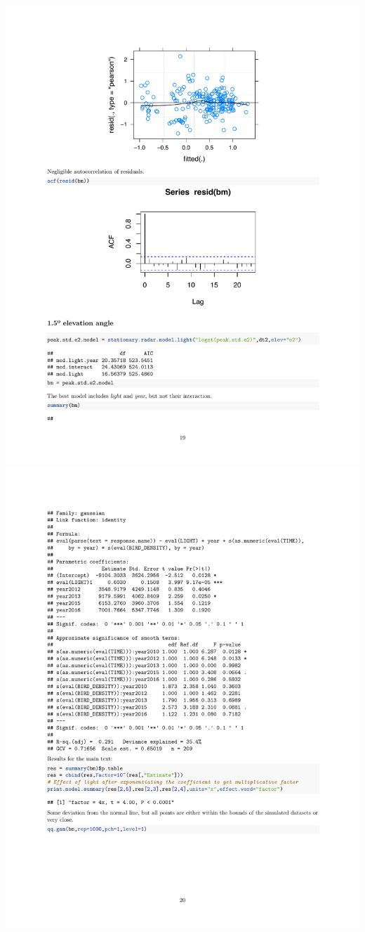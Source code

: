 \documentclass[a4paper, twoside]{templates/ociamthesis}
\begin{document}
\includegraphics[width=1\linewidth]{pdf_chapters/lights/lights_supp_crop_Part53}
\includegraphics[width=1\linewidth]{pdf_chapters/lights/lights_supp_crop_Part54}
\end{document}
